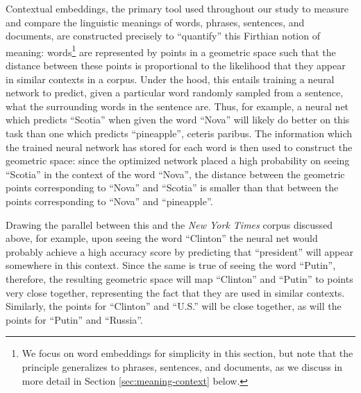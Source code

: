 \documentclass[11pt]{article}
\begin{document}
Contextual embeddings, the primary tool used throughout our study to measure and compare the linguistic meanings of words, phrases, sentences, and documents, are constructed precisely to ``quantify'' this Firthian notion of meaning: words\footnote{We focus on word embeddings for simplicity in this section, but note that the principle generalizes to phrases, sentences, and documents, as we discuss in more detail in Section \ref{sec:meaning-context} below.} are represented by points in a geometric space such that the distance between these points is proportional to the likelihood that they appear in similar contexts in a corpus. Under the hood, this entails training a neural network to predict, given a particular word randomly sampled from a sentence, what the surrounding words in the sentence are. Thus, for example, a neural net which predicts ``Scotia'' when given the word ``Nova'' will likely do better on this task than one which predicts ``pineapple'', ceteris paribus. The information which the trained neural network has stored for each word is then used to construct the geometric space: since the optimized network placed a high probability on seeing ``Scotia'' in the context of the word ``Nova'', the distance between the geometric points corresponding to ``Nova'' and ``Scotia'' is smaller than that between the points corresponding to ``Nova'' and ``pineapple''.
	
Drawing the parallel between this and the \textit{New York Times} corpus discussed above, for example, upon seeing the word ``Clinton'' the neural net would probably achieve a high accuracy score by predicting that ``president'' will appear somewhere in this context. Since the same is true of seeing the word ``Putin'', therefore, the resulting geometric space will map ``Clinton'' and ``Putin'' to points very close together, representing the fact that they are used in similar contexts. Similarly, the points for ``Clinton'' and ``U.S.'' will be close together, as will the points for ``Putin'' and ``Russia''.

\end{document}
